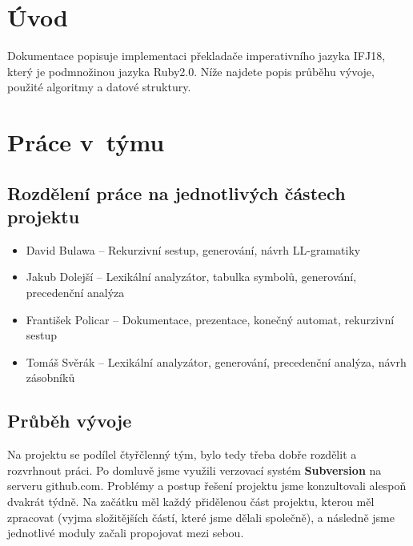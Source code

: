 \documentclass[a4paper, 12pt]{article}
\begin{document}
\tableofcontents
\newpage
\section{Úvod} \label{uvod}

Dokumentace popisuje implementaci překladače imperativního jazyka IFJ18, který je podmnožinou jazyka Ruby2.0. Níže najdete popis průběhu vývoje, použité algoritmy a datové struktury. 

\section{Práce v~týmu} \label{team}

\subsection{Rozdělení práce na jednotlivých částech projektu}
\begin{itemize}
                \item David Bulawa -- Rekurzivní sestup, generování, návrh LL-gramatiky
                \item Jakub Dolejší -- Lexikální analyzátor, tabulka symbolů, generování, precedenční analýza
                \item František Policar -- Dokumentace, prezentace, konečný automat, rekurzivní sestup 
                \item Tomáš Svěrák  -- Lexikální analyzátor, generování, precedenční analýza, návrh zásobníků 
                
\end{itemize}

\subsection{Průběh vývoje}

Na projektu se podílel čtyřčlenný tým, bylo tedy třeba dobře rozdělit a rozvrhnout práci. Po domluvě jsme využili verzovací systém {\bf Subversion} na serveru github.com. Problémy a postup řešení projektu jsme konzultovali alespoň dvakrát týdně. Na začátku měl každý přidělenou část projektu, kterou měl zpracovat (vyjma složitějších částí, které jsme dělali společně), a následně jsme jednotlivé moduly začali propojovat mezi sebou.
\end{document}
